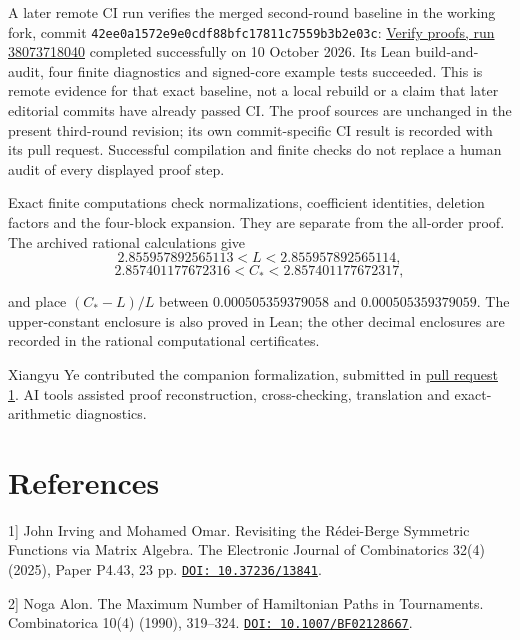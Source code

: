 \documentclass[11pt,a4paper]{article}
\begin{document}
A later remote CI run verifies the merged second-round baseline in the working fork, commit \texttt{42ee0a15\allowbreak{}72e9e0cd\allowbreak{}f88bfc17\allowbreak{}811c7559\allowbreak{}b3b2e03c}: \href{https://github.com/makerY666/tournament-hamiltonian-paths/actions/runs/38073718040}{Verify proofs, run 38073718040} completed successfully on 10 October 2026. Its Lean build-and-audit, four finite diagnostics and signed-core example tests succeeded. This is remote evidence for that exact baseline, not a local rebuild or a claim that later editorial commits have already passed CI. The proof sources are unchanged in the present third-round revision; its own commit-specific CI result is recorded with its pull request. Successful compilation and finite checks do not replace a human audit of every displayed proof step.

Exact finite computations check normalizations, coefficient identities, deletion factors and the four-block expansion. They are separate from the all-order proof. The archived rational calculations give
\[2.855957892565113<L<2.855957892565114,\]
\nopagebreak[3]\[2.857401177672316<C_*<2.857401177672317,\]

and place \((C_*-L)/L\) between \(0.000505359379058\) and \(0.000505359379059\). The upper-constant enclosure is also proved in Lean; the other decimal enclosures are recorded in the rational computational certificates.

Xiangyu Ye contributed the companion formalization, submitted in \href{https://github.com/LStar404/tournament-hamiltonian-paths/pull/1}{pull request 1}. AI tools assisted proof reconstruction, cross-checking, translation and exact-arithmetic diagnostics.

\section*{References}
\label{sec-references}\small

\hypertarget{bib-1}{}\label{bib-1}\noindent {[}1{]} John Irving and Mohamed Omar. Revisiting the Rédei-Berge Symmetric Functions via Matrix Algebra. The Electronic Journal of Combinatorics 32(4) (2025), Paper P4.43, 23 pp. \href{https://doi.org/10.37236/13841}{\nolinkurl{DOI: 10.37236/13841}}.

\hypertarget{bib-2}{}\label{bib-2}\noindent {[}2{]} Noga Alon. The Maximum Number of Hamiltonian Paths in Tournaments. Combinatorica 10(4) (1990), 319--324. \href{https://doi.org/10.1007/BF02128667}{\nolinkurl{DOI: 10.1007/BF02128667}}.
\end{document}
